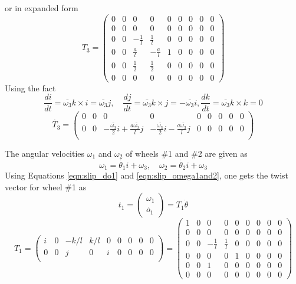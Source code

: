 or in expanded form
\begin{equation}
\label{eqn:slip_T3}
T_3=\left(
\begin{array}{ccccccccc}
0 & 0 & 0 & 0 & 0 & 0 & 0 & 0 & 0 \\
0 & 0 & 0 & 0 & 0 & 0 & 0 & 0 & 0 \\
0 & 0 & -\frac{1}{l} & \frac{1}{l} & 0 & 0 & 0 & 0 & 0 \\
0 & 0 & \frac{a}{l} & -\frac{a}{l} & 1 & 0 & 0 & 0 & 0 \\
0 & 0 & \frac{1}{2} & \frac{1}{2} & 0 & 0 & 0 & 0 & 0 \\
0 & 0 & 0 & 0 & 0 & 0 & 0 & 0 & 0
\end{array}
\right)
\end{equation}
Using the fact \[\frac{d i}{dt}=\bar{\omega_3}k\times i =\bar{\omega_3}j, \quad  \frac{d j}{dt}=\bar{\omega_3}k\times j =-\bar{\omega_3}i, \frac{d k}{dt}=\bar{\omega_3}k\times k =0 \] 
\begin{equation}
\label{eqn:slip_dT3}
\dot{T_3}=\begin{pmatrix}
0 & 0& 0 & 0 & 0 &0 & 0 &0 &0\\
0 & 0&-\frac{ \bar{\omega_3}}{2}i +\frac{a \bar{\omega_3}}{l}j& -\frac{ \bar{\omega_3}}{2}i -\frac{a \bar{\omega_3}}{l}j & 0 &0 & 0 &0 &0\\ 
\end{pmatrix}
\end{equation}

The angular velocities $\omega_1$ and $\omega_2$ of wheels \#1 and \#2 are given as
\begin{equation}
\label{eqn:slip_omega1and2}
\omega_1=\dot{\theta_1}i+\omega_3, \quad \omega_2=\dot{\theta_2}i+\omega_3
\end{equation}
Using Equations \ref{eqn:slip_do1} and \ref{eqn:slip_omega1and2}, one gets the twist vector for wheel \#1 as 
\begin{equation}
\label{eqn:slip_t1}
t_1=
\begin{pmatrix}
\omega_1\\
\dot{o_1}
\end{pmatrix}=T_1 \dot{\theta}
\end{equation} 
\begin{equation}
\label{eqn:slip_T1}
T_1=
\begin{pmatrix}
i & 0& -k/l & k/l & 0 &0 & 0 &0 &0\\
0 & 0& j& 0 & i &0 & 0 &0 &0\\ 
\end{pmatrix}=
\left(
\begin{array}{ccccccccc}
1 & 0 & 0 & 0 & 0 & 0 & 0 & 0 & 0 \\
0 & 0 & 0 & 0 & 0 & 0 & 0 & 0 & 0 \\
0 & 0 & -\frac{1}{l} & \frac{1}{l} & 0 & 0 & 0 & 0 & 0 \\
0 & 0 & 0 & 0 & 1 & 0 & 0 & 0 & 0 \\
0 & 0 & 1 & 0 & 0 & 0 & 0 & 0 & 0 \\
0 & 0 & 0 & 0 & 0 & 0 & 0 & 0 & 0
\end{array}
\right)
\end{equation}

